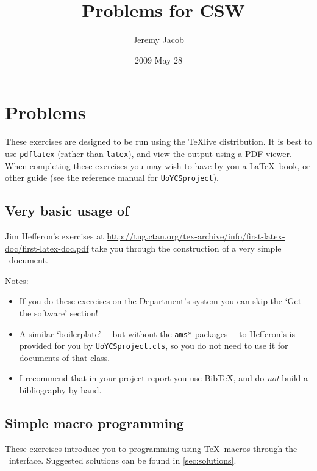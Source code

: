 \documentclass[12pt,14paper]{scrartcl}
\title{\LaTeXe\ Problems for CSW}
\author{Jeremy Jacob}
\date{2009 May 28}
\begin{document}
\maketitle

\section{Problems}

These exercises are designed to be run using the \TeX{}live
distribution.  It is best to use \lstinline{pdflatex} (rather than
\lstinline{latex}), and view the output using a PDF viewer.  When
completing these exercises you may wish to have by you a \LaTeX\ book,
or other guide (see the reference manual for
\lstinline{UoYCSproject}).

\subsection{Very basic usage of \LaTeXe}

Jim Hefferon's exercises at
\url{http://tug.ctan.org/tex-archive/info/first-latex-doc/first-latex-doc.pdf}
take you through the construction of a very simple \LaTeXe\ document.

Notes:
\begin{itemize}
\item If you do these exercises on the Department's system you can
  skip the `Get the software' section!
\item A similar `boilerplate' ---but without the \lstinline{ams*}
  packages--- to Hefferon's is provided for you by
  \lstinline{UoYCSproject.cls}, so you do not need to use it for
  documents of that class.
\item I recommend that in your project report you use Bib\TeX, and do
  \emph{not} build a bibliography by hand.
\end{itemize}

\subsection{Simple macro programming}\label{sec:simplemacro}

These exercises introduce you to programming using \TeX\ macros
through the \LaTeXe\ interface.  Suggested solutions can be found in
\autoref{sec:solutions}.
\end{document}
